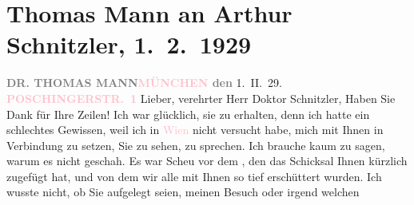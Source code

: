

               \section[Thomas Mann an Arthur Schnitzler, 1. 2. 1929]{ Thomas Mann an Arthur Schnitzler, 1. 2. 1929}\nopagebreak{}\rehead{ }\normalsize\beginnumbering{} \toendnotes[C]{\smallbreak\pagebreak[2]} 
\toendnotes[C]{\smallbreak}\pstart
           \noindent{}{\pb}\textcolor{gray}{\textbf{DR. THOMAS MANN}}\hfill \textcolor{gray}{\textbf{\textcolor{pink}{MÜNCHEN}{}\ledrightnote{\textcolor{pink}{München}} den}}{ }1. II. 29.\pend
           \pstart
           \raggedleft{}\textcolor{gray}{\textbf{\textcolor{pink}{POSCHINGERSTR. 1}{}\ledrightnote{\textcolor{pink}{Poschingerstraße}}}}\pend
           \pstart{}Lieber, verehrter Herr Doktor Schnitzler,\pend\pstart
           Haben Sie Dank für Ihre Zeilen! Ich war glücklich, sie zu erhalten, denn ich hatte
               ein schlechtes Gewissen, weil ich in \textcolor{pink}{Wien}{}\ledrightnote{\textcolor{pink}{Wien}} nicht
               versucht habe, mich mit Ihnen in Verbindung zu setzen, Sie zu sehen, zu sprechen. Ich
               brauche kaum zu sagen, warum es nicht geschah. Es war Scheu vor dem \label{K_L02508_1v}\label{K_L02508_1h}, den das Schicksal
               Ihnen kürzlich zugefügt hat, und von dem wir alle mit Ihnen so tief erschüttert
               wurden. Ich wusste nicht, ob Sie aufgelegt seien, meinen Besuch oder irgend welchen
